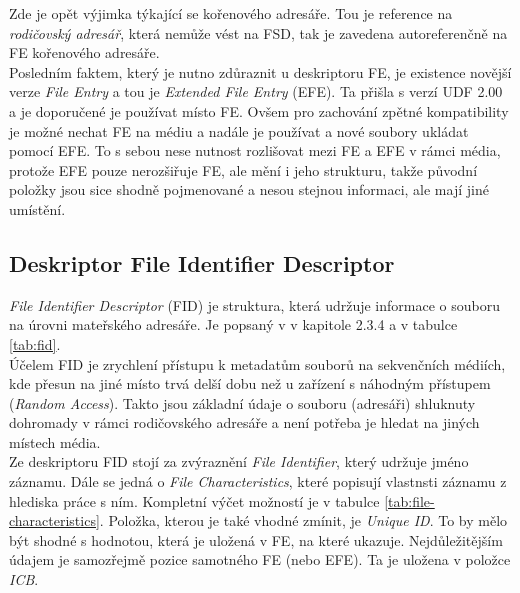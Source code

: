 Zde je opět výjimka týkající se kořenového adresáře. Tou je reference na \textit{rodičovský adresář}, která nemůže vést na FSD, tak je zavedena autoreferenčně na FE kořenového adresáře.\\
Posledním faktem, který je nutno zdůraznit u deskriptoru FE, je existence novější verze \textit{File Entry} a tou je \textit{Extended File Entry} (EFE). Ta přišla s verzí UDF 2.00 a je doporučené je používat místo FE. Ovšem pro zachování zpětné kompatibility je možné nechat FE na médiu a nadále je používat a nové soubory ukládat pomocí EFE. To s sebou nese nutnost rozlišovat mezi FE a EFE v rámci média, protože EFE pouze nerozšiřuje FE, ale mění i jeho strukturu, takže původní položky jsou sice shodně pojmenované a nesou stejnou informaci, ale mají jiné umístění. 

\subsection{Deskriptor File Identifier Descriptor}
\label{subsec:fid}
\textit{File Identifier Descriptor} (FID) je struktura, která udržuje informace o souboru na úrovni mateřského adresáře. Je popsaný v \cite{osta-udf-0201} v kapitole 2.3.4 a v tabulce \ref{tab:fid}.\\
Účelem FID je zrychlení přístupu k metadatům souborů na sekvenčních médiích, kde přesun na jiné místo trvá delší dobu než u zařízení s náhodným přístupem (\textit{Random Access}). Takto jsou základní údaje o souboru (adresáři) shluknuty dohromady v rámci rodičovského adresáře a není potřeba je hledat na jiných místech média.\\
Ze deskriptoru FID stojí za zvýraznění \textit{File Identifier}, který udržuje jméno záznamu. Dále se jedná o \textit{File Characteristics}, které popisují vlastnsti záznamu z hlediska práce s ním. Kompletní výčet možností je v tabulce \ref{tab:file-characteristics}. Položka, kterou je také vhodné zmínit, je \textit{Unique ID}. To by mělo být shodné s hodnotou, která je uložená v FE, na které ukazuje. Nejdůležitějším údajem je samozřejmě pozice samotného FE (nebo EFE). Ta je uložena v položce \textit{ICB}. 
